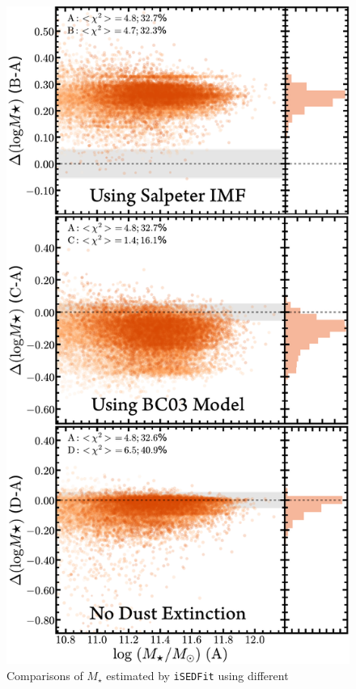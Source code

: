 \documentclass[fleqn,usenatbib]{mnras}
\def\mstar{{$M_{\star}$}}
\begin{document}
    \begin{figure}
        \begin{center}
        \includegraphics[width=\columnwidth]{fig/redbcg_isedfit_3.pdf}
        \caption{
            Comparisons of \mstar{} estimated by \texttt{iSEDFit} using different
}
\end{center}
\end{figure}
\end{document}
